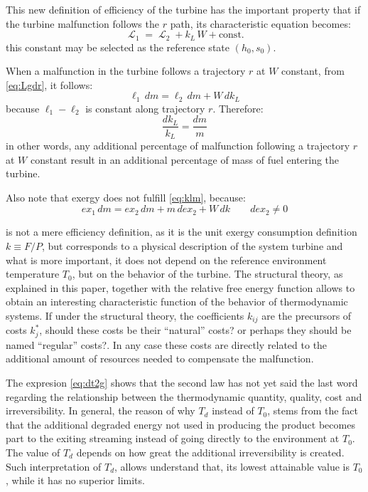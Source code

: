 \documentclass[energies,article,submit,moreauthors,pdftex]{Definitions/mdpi}
\DeclareMathOperator{\Lgdr}{\mathcal{L}}
\begin{document}
This new definition of efficiency of the turbine has the important property that if the turbine malfunction follows the $r$ path, its characteristic equation becomes:
\begin{equation}
\Lgdr_1=\Lgdr_2 + k_L\,W + \text{const}.
\label{eq:Lgdr}
\end{equation}
this constant may be selected as the reference state $(h_0,s_0)$.

When a malfunction in the turbine follows a trajectory $r$ at $W$ constant, from \cref{eq:Lgdr}, it follows:
\begin{equation}
    \ell_1\, dm = \ell_2\, dm + W\,dk_L
\end{equation}
because $\ell_1-\ell_2$ is constant along trajectory $r$. Therefore:
\begin{equation}
    \frac{dk_L}{k_L}=\frac{dm}{m}
    \label{eq:klm}
\end{equation}
in other words, any additional percentage of malfunction following a trajectory $r$ at $W$ constant result in an additional percentage of mass of fuel entering the turbine.

Also note that exergy does not fulfill \cref{eq:klm}, because:
\[
	ex_1\,dm = ex_2\,dm + m\,dex_2 + W\,dk\qquad dex_2\neq0
\]

 is not a mere efficiency definition, as it is the unit exergy consumption definition $k\equiv F/P$, but corresponds to a physical description of the system turbine and what is more important, it does not depend on the reference environment temperature $T_0$, but on the behavior of the turbine. The structural theory, as explained in this paper, together with the relative free energy function allows to obtain an interesting characteristic function of the behavior of thermodynamic systems. If under the structural theory, the coefficients $k_{ij}$ are the precursors of costs $k_j^*$, should these costs be their “natural” costs? or perhaps they should be named “regular” costs?. In any case these costs are directly related to the  additional amount of resources needed to compensate the malfunction.

The expresion \eqref{eq:dt2g} shows that the second law has not yet said the last word regarding the relationship between the thermodynamic quantity, quality, cost and irreversibility. In general, the reason of why $T_d$ instead of $T_0$, stems from the fact that the additional degraded energy not used in producing the product becomes part to the exiting streaming instead of going directly to the environment at $T_0$.  The value of $T_d$ depends on how great the additional irreversibility is created. Such interpretation of $T_d$, allows understand that, its lowest attainable value is $T_0$, while it has no superior limits.
\end{document}
